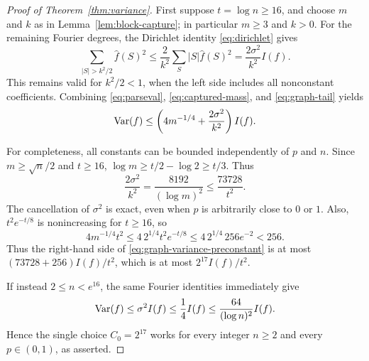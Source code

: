 \begin{proof}[Proof of Theorem~\ref{thm:variance}]
First suppose $t=\log n\ge16$, and choose $m$ and $k$ as in
Lemma~\ref{lem:block-capture}; in particular $m\ge3$ and $k>0$.
For the remaining Fourier degrees, the Dirichlet identity
\eqref{eq:dirichlet} gives
\begin{equation}
 \sum_{|S|>k^2/2}\widehat f(S)^2
 \le\frac2{k^2}\sum_S|S|\widehat f(S)^2
 =\frac{2\sigma^2}{k^2}I(f).
 \label{eq:graph-tail}
\end{equation}
This remains valid for $k^2/2<1$, when the left side includes all
nonconstant coefficients.  Combining \eqref{eq:parseval},
\eqref{eq:captured-mass}, and \eqref{eq:graph-tail} yields
\begin{equation}
 \operatorname{Var}(f)\le
 \left(4m^{-1/4}+\frac{2\sigma^2}{k^2}\right)I(f).
 \label{eq:graph-variance-preconstant}
\end{equation}

For completeness, all constants can be bounded independently of
$p$ and $n$.  Since $m\ge\sqrt n/2$ and $t\ge16$,
$\log m\ge t/2-\log2\ge t/3$.  Thus
\[
 \frac{2\sigma^2}{k^2}
 =\frac{8192}{(\log m)^2}\le\frac{73728}{t^2}.
\]
The cancellation of $\sigma^2$ is exact, even when $p$ is arbitrarily
close to $0$ or $1$.  Also, $t^2e^{-t/8}$ is nonincreasing for
$t\ge16$, so
\[
 4m^{-1/4}t^2
 \le4\,2^{1/4}t^2e^{-t/8}
 \le4\,2^{1/4}\,256e^{-2}<256.
\]
Thus the right-hand side of \eqref{eq:graph-variance-preconstant} is at most
$(73728+256)I(f)/t^2$, which is at most
$2^{17}I(f)/t^2$.

If instead $2\le n<e^{16}$, the same Fourier identities immediately
give
\[
 \operatorname{Var}(f)\le\sigma^2I(f)\le\frac14 I(f)
 \le\frac{64}{(\log n)^2}I(f).
\]
Hence the single choice $C_0=2^{17}$ works for every integer $n\ge2$
and every $p\in(0,1)$, as asserted.
\end{proof}
